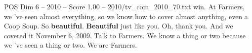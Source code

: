 \begin{textsample}{POS Dim 6 – 2010 – Score 1.00 – 2010/tv\_com\_2010\_70.txt}  \label{ex:f6_pos_063}
win.
At Farmers, we 've seen almost everything, so we know how to cover almost anything, even a Coop Soup.
So \textbf{beautiful}. \textbf{Beautiful} just like you.
Oh, thank you.
And we covered it November 6, 2009.
Talk to Farmers.
We know a thing or two because we 've seen a thing or two.
We are Farmers.

\end{textsample}
